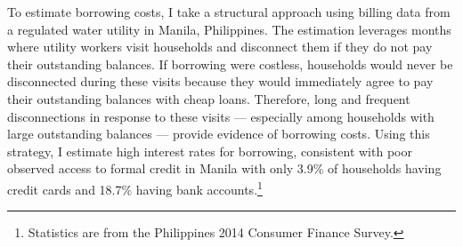 \documentclass[12pt]{article}
\begin{document}
To estimate borrowing costs, I take a structural approach using billing data from a regulated water utility in Manila, Philippines.  The estimation leverages months where utility workers visit households and disconnect them if they do not pay their outstanding balances.  If borrowing were costless, households would never be disconnected during these visits because they would immediately agree to pay their outstanding balances with cheap loans.  Therefore, long and frequent disconnections in response to these visits --- especially among households with large outstanding balances --- provide evidence of borrowing costs.  Using this strategy, I estimate high interest rates for borrowing, consistent with poor observed access to formal credit in Manila with only 3.9\% of households having credit cards and 18.7\% having bank accounts.\footnote{Statistics are from the Philippines 2014 Consumer Finance Survey.}  






\end{document}
